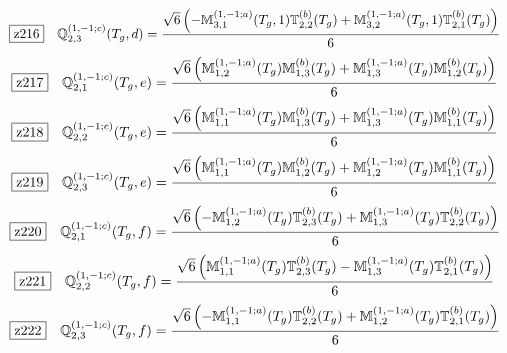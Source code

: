 \documentclass[fleqn,10pt,landscape]{jsarticle}
\begin{document}
\begin{dmath*}
\hspace*{3mm}\fbox{z216}\quad \mathbb{Q}_{2,3}^{(1,-1;c)}(T_{g},d)=\frac{\sqrt{6} \left(- \mathbb{M}_{3,1}^{(1,-1;a)}(T_{g},1) \mathbb{T}_{2,2}^{(b)}(T_{g}) + \mathbb{M}_{3,2}^{(1,-1;a)}(T_{g},1) \mathbb{T}_{2,1}^{(b)}(T_{g})\right)}{6}
\end{dmath*}
\begin{dmath*}
\hspace*{3mm}\fbox{z217}\quad \mathbb{Q}_{2,1}^{(1,-1;c)}(T_{g},e)=\frac{\sqrt{6} \left(\mathbb{M}_{1,2}^{(1,-1;a)}(T_{g}) \mathbb{M}_{1,3}^{(b)}(T_{g}) + \mathbb{M}_{1,3}^{(1,-1;a)}(T_{g}) \mathbb{M}_{1,2}^{(b)}(T_{g})\right)}{6}
\end{dmath*}
\begin{dmath*}
\hspace*{3mm}\fbox{z218}\quad \mathbb{Q}_{2,2}^{(1,-1;c)}(T_{g},e)=\frac{\sqrt{6} \left(\mathbb{M}_{1,1}^{(1,-1;a)}(T_{g}) \mathbb{M}_{1,3}^{(b)}(T_{g}) + \mathbb{M}_{1,3}^{(1,-1;a)}(T_{g}) \mathbb{M}_{1,1}^{(b)}(T_{g})\right)}{6}
\end{dmath*}
\begin{dmath*}
\hspace*{3mm}\fbox{z219}\quad \mathbb{Q}_{2,3}^{(1,-1;c)}(T_{g},e)=\frac{\sqrt{6} \left(\mathbb{M}_{1,1}^{(1,-1;a)}(T_{g}) \mathbb{M}_{1,2}^{(b)}(T_{g}) + \mathbb{M}_{1,2}^{(1,-1;a)}(T_{g}) \mathbb{M}_{1,1}^{(b)}(T_{g})\right)}{6}
\end{dmath*}
\begin{dmath*}
\hspace*{3mm}\fbox{z220}\quad \mathbb{Q}_{2,1}^{(1,-1;c)}(T_{g},f)=\frac{\sqrt{6} \left(- \mathbb{M}_{1,2}^{(1,-1;a)}(T_{g}) \mathbb{T}_{2,3}^{(b)}(T_{g}) + \mathbb{M}_{1,3}^{(1,-1;a)}(T_{g}) \mathbb{T}_{2,2}^{(b)}(T_{g})\right)}{6}
\end{dmath*}
\begin{dmath*}
\hspace*{3mm}\fbox{z221}\quad \mathbb{Q}_{2,2}^{(1,-1;c)}(T_{g},f)=\frac{\sqrt{6} \left(\mathbb{M}_{1,1}^{(1,-1;a)}(T_{g}) \mathbb{T}_{2,3}^{(b)}(T_{g}) - \mathbb{M}_{1,3}^{(1,-1;a)}(T_{g}) \mathbb{T}_{2,1}^{(b)}(T_{g})\right)}{6}
\end{dmath*}
\begin{dmath*}
\hspace*{3mm}\fbox{z222}\quad \mathbb{Q}_{2,3}^{(1,-1;c)}(T_{g},f)=\frac{\sqrt{6} \left(- \mathbb{M}_{1,1}^{(1,-1;a)}(T_{g}) \mathbb{T}_{2,2}^{(b)}(T_{g}) + \mathbb{M}_{1,2}^{(1,-1;a)}(T_{g}) \mathbb{T}_{2,1}^{(b)}(T_{g})\right)}{6}
\end{dmath*}
\end{document}
